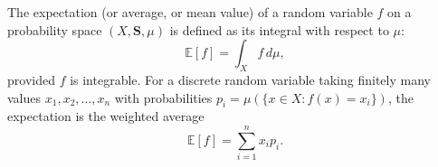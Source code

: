 The expectation (or average, or mean value) of a random variable $f$ on a probability space $(X, \mathbf{S}, \mu)$ is defined as its integral with respect to $\mu$:
$$\mathbb{E}[f] = \int_X f \, d\mu,$$
provided $f$ is integrable. For a discrete random variable taking finitely many values $x_1, x_2, \ldots, x_n$ with probabilities $p_i = \mu(\{x \in X : f(x) = x_i\})$, the expectation is the weighted average
$$\mathbb{E}[f] = \sum_{i=1}^{n} x_i p_i.$$
